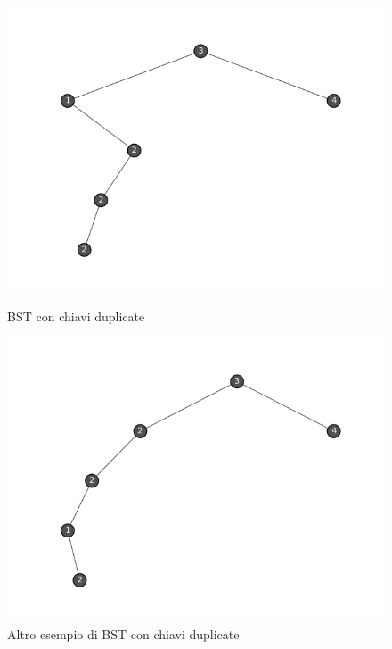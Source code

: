 \documentclass{article}
\begin{document}
\begin{figure}[htbp]
  \begin{minipage}{0.5\textwidth}
    \centering
    \includegraphics[width=\linewidth]{./images/bst-normal-img1}
    \caption{BST con chiavi duplicate}
    \label{fig:bst-normal-img1}
  \end{minipage}%
  \begin{minipage}{0.5\textwidth}
    \centering
    \includegraphics[width=\linewidth]{./images/bst-normal-img2}
    \caption{Altro esempio di BST con chiavi duplicate}
    \label{fig:bst-normal-img2}
  \end{minipage}
\end{figure}
\end{document}
